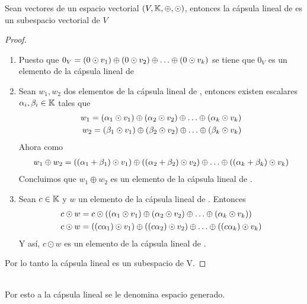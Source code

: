 \begin{theorem}
Sean  vectores de un espacio vectorial $(V,\mathbb{K},\oplus,\odot)$, entonces la cápsula lineal de  es un subespacio vectorial de $V$
\end{theorem}
\begin{proof}~\\
\begin{enumerate}
\item Puesto que $0_V=  \left(0 \odot v_1\right)  \oplus
 \left(0 \odot v_2\right)  \oplus 
\hdots \oplus
 \left(0 \odot v_k\right) $ se tiene que $0_V$ es un elemento de la cápsula lineal de 
\item Sean $w_1, w_2$ dos elementos de la cápsula lineal de , entonces existen escalares $\alpha_i, \beta_i \in \mathbb{K}$ tales que \begin{align*}
w_1= \left(\alpha_1 \odot v_1\right)  \oplus
 \left(\alpha_2 \odot v_2\right)  \oplus 
\hdots \oplus
 \left(\alpha_k \odot v_k\right) \\
w_2= \left(\beta_1 \odot v_1\right)  \oplus
 \left(\beta_2 \odot v_2\right)  \oplus 
\hdots \oplus
 \left(\beta_k \odot v_k\right) \\
\end{align*}
Ahora como
\begin{align*}
w_1\oplus w_2= \left((\alpha_1 + \beta_1) \odot v_1\right)  \oplus
 \left((\alpha_2 + \beta_2) \odot v_2\right)  \oplus 
\hdots \oplus
 \left((\alpha_k +\beta_k) \odot v_k\right) 
\end{align*}
Concluimos que $w_1\oplus w_2$ es un elemento de la cápsula lineal de .

\item Sean $c \in \mathbb{K}$ y $w$ un elemento de la cápsula lineal de . Entonces 
\begin{align*}
c\odot w&=c\odot ( \left(\alpha_1 \odot v_1\right)  \oplus
 \left(\alpha_2 \odot v_2\right)  \oplus 
\hdots \oplus
 \left(\alpha_k \odot v_k\right) )\\
c\odot w&= \left((c\alpha_1) \odot v_1\right)  \oplus
 \left((c\alpha_2) \odot v_2\right)  \oplus 
\hdots \oplus
 \left((c\alpha_k) \odot v_k\right) \\
\end{align*}
Y así, $c\odot w$ es un elemento de la cápsula lineal de .
\end{enumerate}
Por lo tanto la cápsula lineal es un subespacio de V.
\end{proof}


~\\
Por esto a la cápsula lineal se le denomina espacio generado.

